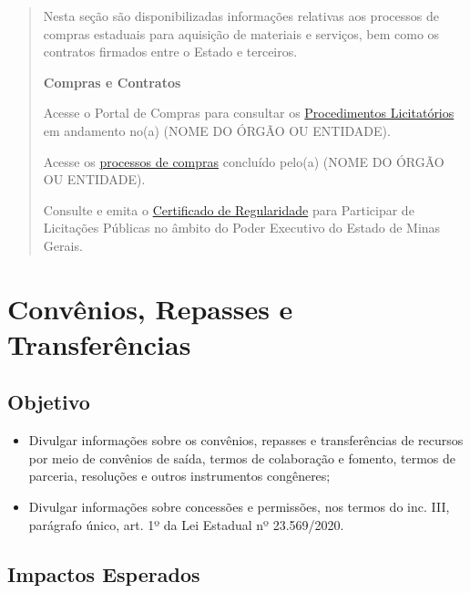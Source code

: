 \documentclass[
]{book}
\providecommand{\tightlist}{%
  \setlength{\itemsep}{0pt}\setlength{\parskip}{0pt}}
\begin{document}
\begin{quote}
Nesta seção são disponibilizadas informações relativas aos processos de compras estaduais para aquisição de materiais e serviços, bem como os contratos firmados entre o Estado e terceiros.

\textbf{Compras e Contratos}

Acesse o Portal de Compras para consultar os \href{http://compras.mg.gov.br/}{Procedimentos Licitatórios} em andamento no(a) (NOME DO ÓRGÃO OU ENTIDADE).

Acesse os \href{http://www.transparencia.mg.gov.br/compras-e-patrimonio/compras-e-contratos}{processos de compras} concluído pelo(a) (NOME DO ÓRGÃO OU ENTIDADE).

Consulte e emita o \href{https://www.cagef.mg.gov.br/fornecedor-web/br/gov/prodemge/seplag/fornecedor/publico/index.zul}{Certificado de Regularidade} para Participar de Licitações Públicas no âmbito do Poder Executivo do Estado de Minas Gerais.
\end{quote}

\hypertarget{convuxeanios-repasses-e-transferuxeancias}{%
\section{Convênios, Repasses e Transferências}\label{convuxeanios-repasses-e-transferuxeancias}}

\hypertarget{objetivo-6}{%
\subsection{Objetivo}\label{objetivo-6}}

\begin{itemize}
\tightlist
\item
  Divulgar informações sobre os convênios, repasses e transferências de recursos por meio de convênios de saída, termos de colaboração e fomento, termos de parceria, resoluções e outros instrumentos congêneres;
\item
  Divulgar informações sobre concessões e permissões, nos termos do inc. III, parágrafo único, art. 1º da Lei Estadual nº 23.569/2020.
\end{itemize}

\hypertarget{impactos-esperados-7}{%
\subsection{Impactos Esperados}\label{impactos-esperados-7}}
\end{document}
